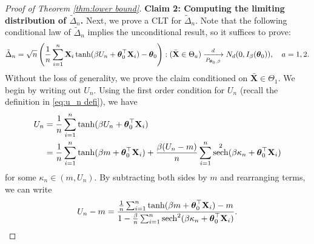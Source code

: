\documentclass[preprint,reqno]{imsart}
\newcommand{\ttheta}{\boldsymbol{\theta}}
\DeclareMathOperator{\sech}{sech}
\newcommand{\X}{\mathbf{X}}
\DeclareMathOperator{\sumin}{\sum_{\mathnormal i=1}^{\mathnormal n}}
\begin{document}
\begin{appendix}
\begin{proof}[Proof of Theorem \ref{thm:lower bound}]
\textbf{Claim 2: Computing the limiting distribution of $\tilde{\Delta}_n$.} 
Next, we prove a CLT for $\tilde{\Delta}_n$.
Note that the following conditional law of $\tilde{\Delta}_n$ implies the unconditional result, so it suffices to prove:
$$\tilde{\Delta}_n = \sqrt{n} \left(\frac{1}{n} \sumin \X_i \tanh(\beta U_n + \ttheta_0^\top \X_i) - \ttheta_0 \right) : (\bar{\X} \in \Theta_a) \xrightarrow[P_{\ttheta_0, \beta}]{d}N_d (0, I_\beta(\ttheta_0)),\quad a=1,2.$$
Without the loss of generality, we prove the claim conditioned on $\bar{\X} \in \Theta_1$. We begin by writing out $U_n$.
Using the first order condition for $U_n$ (recall the definition in \eqref{eq:u_n defi}), we have
\begin{align*}
    U_n &= \frac{1}{n} \sumin \tanh(\beta U_n + \ttheta_0^\top \X_i) \\
    &= \frac{1}{n} \sumin \tanh(\beta m + \ttheta_0^\top \X_i) + \frac{\beta (U_n - m)}{n} \sumin \sech^2(\beta \kappa_n + \ttheta_0^\top \X_i)
\end{align*}
for some $\kappa_n \in (m, U_n)$. By subtracting both sides by $m$ and rearranging terms, we can write
\begin{align*}
    U_n - m = \frac{ \frac{1}{n} \sumin \tanh(\beta m + \ttheta_0^\top \X_i) - m}{1 - \frac{\beta}{n} \sumin \sech^2(\beta \kappa_n + \ttheta_0^\top \X_i)}.
\end{align*}


\end{proof}
\end{appendix}
\end{document}
